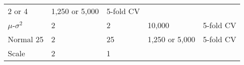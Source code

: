\documentclass[]{article}
\begin{document}
\begin{longtable}[]{@{}lllll@{}}
\begin{minipage}[t]{0.21\columnwidth}
2 or 4\strut
\end{minipage} & \begin{minipage}[t]{0.15\columnwidth}\raggedright
1,250 or 5,000\strut
\end{minipage} & \begin{minipage}[t]{0.15\columnwidth}\raggedright
5-fold CV\strut
\end{minipage}\tabularnewline
\begin{minipage}[t]{0.20\columnwidth}\raggedright
\(\mu\)-\(\sigma^2\)\strut
\end{minipage} & \begin{minipage}[t]{0.15\columnwidth}\raggedright
2\strut
\end{minipage} & \begin{minipage}[t]{0.21\columnwidth}\raggedright
2\strut
\end{minipage} & \begin{minipage}[t]{0.15\columnwidth}\raggedright
10,000\strut
\end{minipage} & \begin{minipage}[t]{0.15\columnwidth}\raggedright
5-fold CV\strut
\end{minipage}\tabularnewline
\begin{minipage}[t]{0.20\columnwidth}\raggedright
Normal 25\strut
\end{minipage} & \begin{minipage}[t]{0.15\columnwidth}\raggedright
2\strut
\end{minipage} & \begin{minipage}[t]{0.21\columnwidth}\raggedright
25\strut
\end{minipage} & \begin{minipage}[t]{0.15\columnwidth}\raggedright
1,250 or 5,000\strut
\end{minipage} & \begin{minipage}[t]{0.15\columnwidth}\raggedright
5-fold CV\strut
\end{minipage}\tabularnewline
\begin{minipage}[t]{0.20\columnwidth}\raggedright
Scale\strut
\end{minipage} & \begin{minipage}[t]{0.15\columnwidth}\raggedright
2\strut
\end{minipage} & \begin{minipage}[t]{0.21\columnwidth}\raggedright
1\strut
\end{minipage} & \begin{minipage}[t]{0.15\columnwidth}\raggedright

\end{minipage}
\end{longtable}
\end{document}
